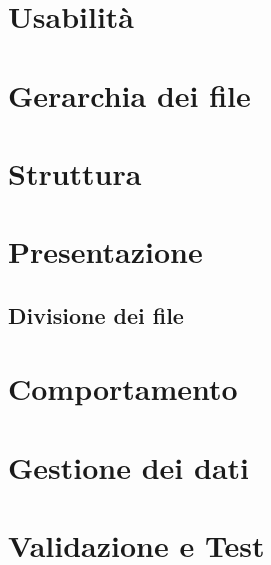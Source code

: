 \documentclass[10pt, a4paper]{article}
\begin{document}
\section{Usabilità}

\section{Gerarchia dei file}

\section{Struttura}

\section{Presentazione}
	\subsection{Divisione dei file}

\section{Comportamento}

\section{Gestione dei dati}

\section{Validazione e Test}
\end{document}
